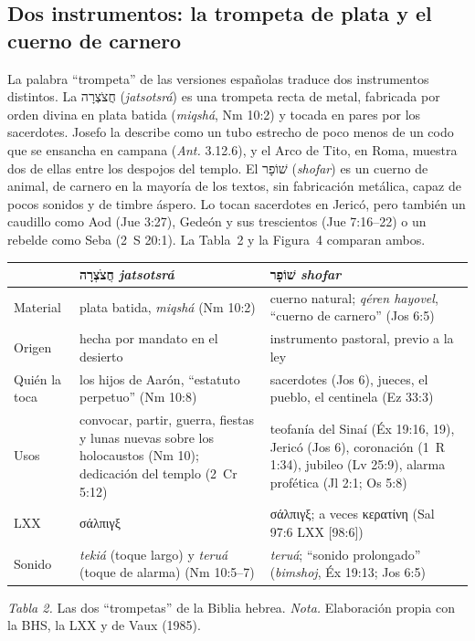 \documentclass[11pt,letterpaper]{article}
\newcommand{\heb}[1]{\mbox{\foreignlanguage{hebrew}{#1}}}
\newcommand{\grc}[1]{\foreignlanguage{ancientgreek}{#1}}
\begin{document}
\subsection{Dos instrumentos: la trompeta de plata y el cuerno de carnero}
La palabra ``trompeta'' de las versiones españolas traduce dos instrumentos distintos. La \heb{חֲצֹצְרָה} (\emph{jatsotsrá}) es una trompeta recta de metal, fabricada por orden divina en plata batida (\emph{miqshá}, Nm 10:2) y tocada en pares por los sacerdotes. Josefo la describe como un tubo estrecho de poco menos de un codo que se ensancha en campana (\emph{Ant.} 3.12.6), y el Arco de Tito, en Roma, muestra dos de ellas entre los despojos del templo. El \heb{שׁוֹפָר} (\emph{shofar}) es un cuerno de animal, de carnero en la mayoría de los textos, sin fabricación metálica, capaz de pocos sonidos y de timbre áspero. Lo tocan sacerdotes en Jericó, pero también un caudillo como Aod (Jue 3:27), Gedeón y sus trescientos (Jue 7:16--22) o un rebelde como Seba (2~S 20:1). La Tabla~2 y la Figura~4 comparan ambos.

\begin{center}\begin{minipage}{\linewidth}\centering\small\renewcommand{\arraystretch}{1.18}
\begin{tabular}{@{}L{2.4cm}L{6.0cm}L{6.0cm}@{}}
\toprule
& \textbf{\heb{חֲצֹצְרָה} \emph{jatsotsrá}} & \textbf{\heb{שׁוֹפָר} \emph{shofar}} \\ \midrule
Material & plata batida, \emph{miqshá} (Nm 10:2) & cuerno natural; \emph{qéren hayovel}, ``cuerno de carnero'' (Jos 6:5) \\
Origen & hecha por mandato en el desierto & instrumento pastoral, previo a la ley \\
Quién la toca & los hijos de Aarón, ``estatuto perpetuo'' (Nm 10:8) & sacerdotes (Jos 6), jueces, el pueblo, el centinela (Ez 33:3) \\
Usos & convocar, partir, guerra, fiestas y lunas nuevas sobre los holocaustos (Nm 10); dedicación del templo (2~Cr 5:12) & teofanía del Sinaí (Éx 19:16, 19), Jericó (Jos 6), coronación (1~R 1:34), jubileo (Lv 25:9), alarma profética (Jl 2:1; Os 5:8) \\
LXX & \grc{σάλπιγξ} & \grc{σάλπιγξ}; a veces \grc{κερατίνη} (Sal 97:6 LXX [98:6]) \\
Sonido & \emph{tekiá} (toque largo) y \emph{teruá} (toque de alarma) (Nm 10:5--7) & \emph{teruá}; ``sonido prolongado'' (\emph{bimshoj}, Éx 19:13; Jos 6:5) \\
\bottomrule
\end{tabular}\par
{\footnotesize\color{sepia}\textit{Tabla 2.} Las dos ``trompetas'' de la Biblia hebrea. \textit{Nota.} Elaboración propia con la BHS, la LXX y de Vaux (1985).}
\end{minipage}\end{center}
\end{document}
